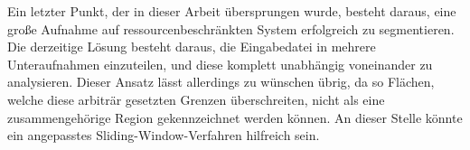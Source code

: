 Ein letzter Punkt, der in dieser Arbeit übersprungen wurde, besteht daraus, eine große Aufnahme auf ressourcenbeschränkten System erfolgreich zu segmentieren. Die derzeitige Lösung besteht daraus, die Eingabedatei in mehrere Unteraufnahmen einzuteilen, und diese komplett unabhängig voneinander zu analysieren. Dieser Ansatz lässt allerdings zu wünschen übrig, da so Flächen, welche diese arbiträr gesetzten Grenzen überschreiten, nicht als eine zusammengehörige Region gekennzeichnet werden können. An dieser Stelle könnte ein angepasstes Sliding-Window-Verfahren hilfreich sein.